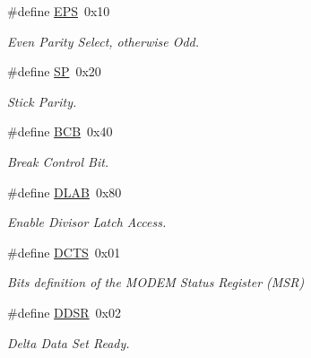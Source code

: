 \begin{DoxyCompactItemize}
\mbox{\label{group__i386__uart_ga6ebf6899d6c1c8b7b9d09be872c05aae}} 
\#define \mbox{\hyperlink{group__i386__uart_ga6ebf6899d6c1c8b7b9d09be872c05aae}{E\+PS}}~0x10
\begin{DoxyCompactList}\small\item\em Even Parity Select, otherwise Odd. \end{DoxyCompactList}\item 
\mbox{\label{group__i386__uart_gaecd69d9a67487cc45c38eb184c50538a}} 
\#define \mbox{\hyperlink{group__i386__uart_gaecd69d9a67487cc45c38eb184c50538a}{SP}}~0x20
\begin{DoxyCompactList}\small\item\em Stick Parity. \end{DoxyCompactList}\item 
\mbox{\label{group__i386__uart_gad47b730af0447138fa95214f9a5d9f49}} 
\#define \mbox{\hyperlink{group__i386__uart_gad47b730af0447138fa95214f9a5d9f49}{B\+CB}}~0x40
\begin{DoxyCompactList}\small\item\em Break Control Bit. \end{DoxyCompactList}\item 
\mbox{\label{group__i386__uart_gaeacff95e17799eeacbff843e63ead9d3}} 
\#define \mbox{\hyperlink{group__i386__uart_gaeacff95e17799eeacbff843e63ead9d3}{D\+L\+AB}}~0x80
\begin{DoxyCompactList}\small\item\em Enable Divisor Latch Access. \end{DoxyCompactList}\item 
\#define \mbox{\hyperlink{group__i386__uart_ga230decb2e8e20d6ef3df26c7051f775e}{D\+C\+TS}}~0x01
\begin{DoxyCompactList}\small\item\em Bits definition of the M\+O\+D\+EM Status Register (M\+SR) \end{DoxyCompactList}\item 
\mbox{\label{group__i386__uart_ga6ef491029f03966f58e211a4b3dd731d}} 
\#define \mbox{\hyperlink{group__i386__uart_ga6ef491029f03966f58e211a4b3dd731d}{D\+D\+SR}}~0x02
\begin{DoxyCompactList}\small\item\em Delta Data Set Ready. \end{DoxyCompactList}\item 

\end{DoxyCompactItemize}

